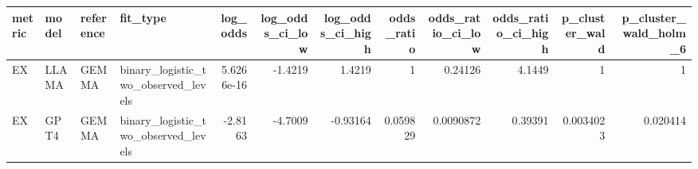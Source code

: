 \begin{tabular}{llllrrrrrrrr}
\toprule
metric & model & reference & fit\_type & log\_odds & log\_odds\_ci\_low & log\_odds\_ci\_high & odds\_ratio & odds\_ratio\_ci\_low & odds\_ratio\_ci\_high & p\_cluster\_wald & p\_cluster\_wald\_holm\_6 \\
\midrule
EX & LLAMA & GEMMA & binary\_logistic\_two\_observed\_levels & 5.6266e-16 & -1.4219 & 1.4219 & 1 & 0.24126 & 4.1449 & 1 & 1 \\
EX & GPT4 & GEMMA & binary\_logistic\_two\_observed\_levels & -2.8163 & -4.7009 & -0.93164 & 0.059829 & 0.0090872 & 0.39391 & 0.0034023 & 0.020414 \\
\bottomrule
\end{tabular}
